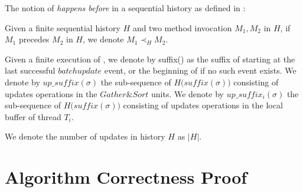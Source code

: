The notion of \emph{happens before} in a sequential history as defined in \cite{Rinberg_2020_fast_sketches}:
\begin{definition}
Given a finite sequential history $\mathit{H}$ and two method invocation $M_1,M_2$ in $\mathit{H}$, if $M_1$ precedes $M_2$ in $\mathit{H}$, we denote $M_1 \prec_H M_2$.
\end{definition}

\begin{definition} \label{Def: unprop_update}
Given a finite execution \s of \mysketch, we denote by suffix(\s) as the suffix of \s starting at the last successful $\mathit{batch update}$ event, or the beginning of \s if no such event exists.
We denote by $\mathit{up\_suffix}(\sigma)$ the sub-sequence of $\mathit{H(suffix}(\sigma))$ consisting of updates operations in the $Gather\&Sort$ units.
We denote by $\mathit{up\_suffix_i}(\sigma)$ the sub-sequence of $\mathit{H(suffix}(\sigma))$ consisting of updates operations in the local buffer of thread $T_i$.
\end{definition}

\begin{definition} \label{Def: updates_num}
We denote the number of updates in history $\mathit{H}$ as $\mathit{|H|}$.
\end{definition}


\section{Algorithm Correctness Proof}


